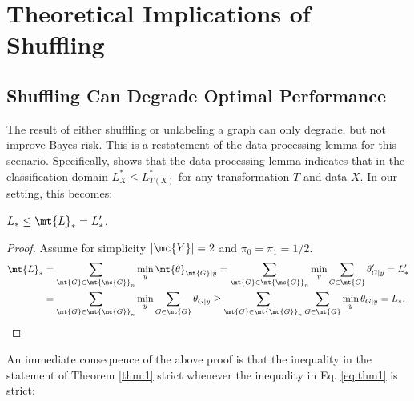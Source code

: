 \documentclass[10pt,journal,cspaper,compsoc]{IEEEtran}
\begin{document}


\section{Theoretical Implications of Shuffling} %
\label{sec:theoretical_results}

\subsection{Shuffling Can Degrade Optimal Performance} %
\label{sec:shuffle}





The result of either shuffling or unlabeling a graph can only degrade, but not improve Bayes risk.  This is a restatement of the data processing lemma for this scenario. Specifically, \cite{Devroye1996} shows that the data processing lemma indicates that in the classification domain $L^*_X \leq L^*_{T(X)}$ for any transformation $T$ and data $X$.  In our setting, this becomes:

\begin{thm} \label{thm:1}
$L_* \leq \mt{L}_*=L_*'$.
\end{thm}

\begin{proof}
	Assume for simplicity $|\mc{Y}|=2$ and $\pi_0=\pi_1=1/2$.  
\begin{align} \label{eq:thm1}
	\mt{L}_*&=\sum_{\mt{G} \in \mt{\mc{G}}_n} \min_y  \mt{\theta}_{\mt{G}|y}  
	=\sum_{\mt{G} \in \mt{\mc{G}}_n} \min_y  \sum_{G \in \mt{G}}\theta_{G|y}'  = L_*' \nonumber \\
	&=\sum_{\mt{G} \in \mt{\mc{G}}_n} \min_y  \sum_{G \in \mt{G}}\theta_{G|y} 
	 \geq \sum_{\mt{G} \in \mt{\mc{G}}_n} \sum_{G \in \mt{G}} \min_y  \theta_{G|y}  = L_*.
\end{align}
\end{proof}



An immediate consequence of the above proof is that the inequality in the statement of Theorem \ref{thm:1} strict whenever the inequality in Eq. \eqref{eq:thm1} is strict:
\end{document}
